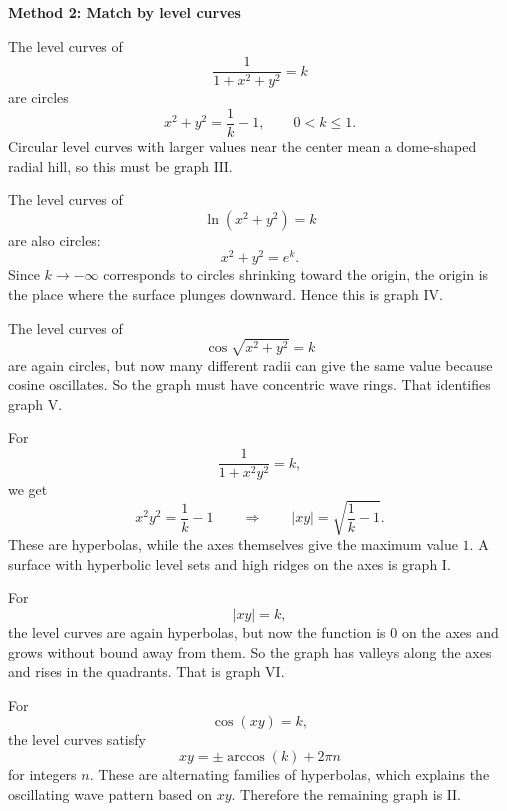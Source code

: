 \documentclass[a4paper,12pt,twocolumn]{article}
\newenvironment{solutionbox}{\begin{framed}}{\end{framed}}
\begin{document}
\begin{solutionbox}
\textbf{Method 2: Match by level curves}

\begin{steps}
\item The level curves of
\[
\frac{1}{1+x^2+y^2}=k
\]
are circles
\[
x^2+y^2=\frac{1}{k}-1,
\qquad 0<k\le 1.
\]
Circular level curves with larger values near the center mean a dome-shaped radial hill, so this must be graph \(\mathrm{III}\).

\item The level curves of
\[
\ln(x^2+y^2)=k
\]
are also circles:
\[
x^2+y^2=e^k.
\]
Since \(k\to-\infty\) corresponds to circles shrinking toward the origin, the origin is the place where the surface plunges downward. Hence this is graph \(\mathrm{IV}\).

\item The level curves of
\[
\cos\sqrt{x^2+y^2}=k
\]
are again circles, but now many different radii can give the same value because cosine oscillates. So the graph must have concentric wave rings. That identifies graph \(\mathrm{V}\).

\item For
\[
\frac{1}{1+x^2y^2}=k,
\]
we get
\[
x^2y^2=\frac{1}{k}-1
\qquad\Longrightarrow\qquad
|xy|=\sqrt{\frac{1}{k}-1}.
\]
These are hyperbolas, while the axes themselves give the maximum value \(1\). A surface with hyperbolic level sets and high ridges on the axes is graph \(\mathrm{I}\).

\item For
\[
|xy|=k,
\]
the level curves are again hyperbolas, but now the function is \(0\) on the axes and grows without bound away from them. So the graph has valleys along the axes and rises in the quadrants. That is graph \(\mathrm{VI}\).

\item For
\[
\cos(xy)=k,
\]
the level curves satisfy
\[
xy=\pm\arccos(k)+2\pi n
\]
for integers \(n\). These are alternating families of hyperbolas, which explains the oscillating wave pattern based on \(xy\). Therefore the remaining graph is \(\mathrm{II}\).
\end{steps}
\end{solutionbox}
\end{document}
